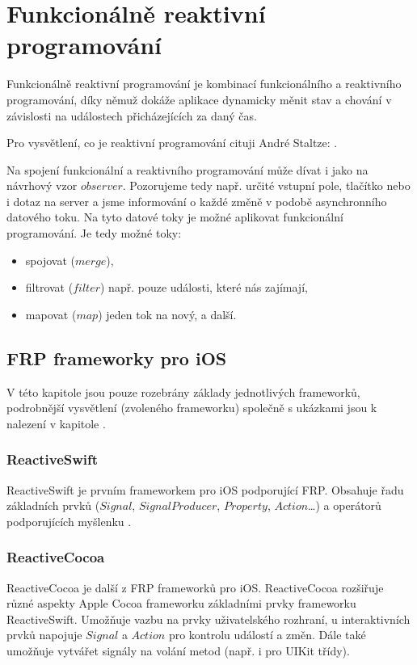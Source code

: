 \documentclass[thesis=M,czech]{FITthesis}[2012/06/26]
\begin{document}
\section{Funkcionálně reaktivní programování}
Funkcionálně reaktivní programování je kombinací funkcionálního a reaktivního programování, díky němuž dokáže aplikace dynamicky měnit stav a chování v závislosti na událostech přicházejících za daný čas. \cite{nayebi2016swift}

Pro vysvětlení, co je reaktivní programování cituji André Staltze: . \cite{Ztaltz2014}

Na spojení funkcionální a reaktivního programování může dívat i jako na návrhový vzor $observer$. \cite{Blackheath2016} Pozorujeme tedy např. určité vstupní pole, tlačítko nebo i dotaz na server a jsme informování o každé změně v podobě asynchronního datového toku. Na tyto datové toky je možné aplikovat funkcionální programování. Je tedy možné toky:
\begin{itemize}
\item spojovat ($merge$),
\item filtrovat ($filter$) např. pouze události, které nás zajímají,
\item mapovat ($map$) jeden tok na nový, a další. \cite{Ztaltz2014}
\end{itemize}

\subsection{FRP frameworky pro iOS}
V této kapitole jsou pouze rozebrány základy jednotlivých frameworků, podrobnější vysvětlení (zvoleného frameworku) společně s ukázkami jsou k nalezení v kapitole .

\subsubsection{ReactiveSwift}
ReactiveSwift je prvním frameworkem pro iOS podporující FRP. Obsahuje řadu základních prvků ($Signal$, $SignalProducer$, $Property$, $Action$\ldots) a operátorů podporujících myšlenku . \cite{ReactiveSwift}

\subsubsection{ReactiveCocoa}
ReactiveCocoa je další z FRP frameworků pro iOS. ReactiveCocoa rozšiřuje různé aspekty Apple Cocoa frameworku základními prvky frameworku ReactiveSwift. Umožňuje vazbu na prvky uživatelského rozhraní, u interaktivních prvků napojuje $Signal$ a $Action$ pro kontrolu událostí a změn. Dále také umožňuje vytvářet signály na volání metod (např. i pro UIKit třídy). \cite{ReactiveCocoa}
\end{document}
